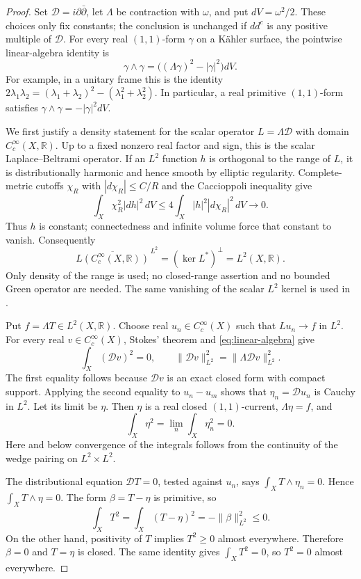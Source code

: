 \documentclass[11pt]{article}
\theoremstyle{remark}
\newcommand{\D}{\mathcal D}
\begin{document}
\begin{proof}
Set $\D=i\partial\bar\partial$, let $\Lambda$ be contraction with
$\omega$, and put $dV=\omega^2/2$. These choices only fix constants;
the conclusion is unchanged if $dd^c$ is any positive multiple of
$\D$. For every real $(1,1)$-form $\gamma$ on a K\"ahler surface,
the pointwise linear-algebra identity is
\begin{equation}\label{eq:linear-algebra}
 \gamma\wedge\gamma
   =\bigl((\Lambda\gamma)^2-|\gamma|^2\bigr)dV.
\end{equation}
For example, in a unitary frame this is the identity
$2\lambda_1\lambda_2=(\lambda_1+\lambda_2)^2-
(\lambda_1^2+\lambda_2^2)$.
In particular, a real primitive $(1,1)$-form satisfies
$\gamma\wedge\gamma=-|\gamma|^2dV$.

We first justify a density statement for the scalar operator
$L=\Lambda\D$ with domain $C_c^\infty(X,\mathbb R)$.
Up to a fixed nonzero real factor and sign, this is the scalar
Laplace--Beltrami operator. If an $L^2$ function $h$ is orthogonal to the range of $L$, it is distributionally harmonic and hence smooth by elliptic regularity. Complete-metric cutoffs $\chi_R$ with $|d\chi_R|\leq C/R$ and the Caccioppoli inequality give
\[
 \int_X\chi_R^2|dh|^2\,dV
 \leq4\int_X|h|^2|d\chi_R|^2\,dV\longrightarrow0.
\]
Thus $h$ is constant; connectedness and infinite volume force that constant to vanish.
Consequently
\[
 \overline{L(C_c^\infty(X,\mathbb R))}^{\,L^2}
  = (\ker L^*)^\perp=L^2(X,\mathbb R).
\]
Only density of the range is used; no closed-range assertion and no
bounded Green operator are needed. The same vanishing of the scalar
$L^2$ kernel is used in \cite[Lemma~3.1.1]{Dingoyan}.

Put $f=\Lambda T\in L^2(X,\mathbb R)$. Choose real
$u_n\in C_c^\infty(X)$ such that $Lu_n\longrightarrow f$ in $L^2$.
For every real $v\in C_c^\infty(X)$, Stokes' theorem and
\eqref{eq:linear-algebra} give
\[
  \int_X(\D v)^2=0,
  \qquad
  \|\D v\|_{L^2}^2=\|\Lambda\D v\|_{L^2}^2.
\]
The first equality follows because $\D v$ is an exact closed form
with compact support. Applying the second equality to $u_n-u_m$
shows that $\eta_n=\D u_n$ is Cauchy in $L^2$. Let its limit be
$\eta$. Then $\eta$ is a real closed $(1,1)$-current,
$\Lambda\eta=f$, and
\[
 \int_X\eta^2=\lim_n\int_X\eta_n^2=0.
\]
Here and below convergence of the integrals follows from the
continuity of the wedge pairing on $L^2\times L^2$.

The distributional equation $\D T=0$, tested against $u_n$, says
$\int_XT\wedge\eta_n=0$. Hence $\int_XT\wedge\eta=0$.
The form $\beta=T-\eta$ is primitive, so
\[
 \int_X T^2
  =\int_X(T-\eta)^2
  =-\|\beta\|_{L^2}^2\leq0.
\]
On the other hand, positivity of $T$ implies $T^2\geq0$
almost everywhere. Therefore $\beta=0$ and $T=\eta$ is closed.
The same identity gives $\int_XT^2=0$, so $T^2=0$ almost everywhere.
\end{proof}
\end{document}
